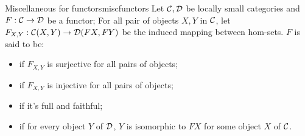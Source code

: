 \documentclass{article}
\begin{document}
\begin{definition}{Miscellaneous for functors}{miscfunctors}
    Let $\mathcal{C},\mathcal{D}$ be locally small categories and $F:\mathcal{C}\to \mathcal{D}$ be a functor; For all pair of objects $X,Y$ in $\mathcal{C}$, let $F_{X,Y} : \mathcal{C}(X,Y)\to \mathcal{D}(FX,FY)$  be the induced mapping between hom-sets. $F$ is said to be:\begin{itemize}
        \item {} if $F_{X,Y}$ is surjective for all pairs of objects;
        \item {} if $F_{X,Y}$ is injective for all pairs of objects;
        \item {} if it's full and faithful;
        \item {} if for every object $Y$ of $\mathcal{D}$, $Y$ is isomorphic to $FX$ for some object $X$ of $\mathcal{C}$.
    \end{itemize}
\end{definition}
\end{document}
